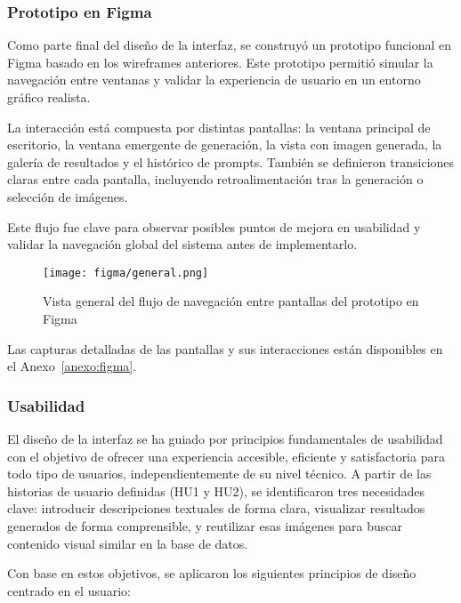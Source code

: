 \subsubsection{Prototipo en Figma}

Como parte final del diseño de la interfaz, se construyó un prototipo funcional en Figma basado en los wireframes anteriores. Este prototipo permitió simular la navegación entre ventanas y validar la experiencia de usuario en un entorno gráfico realista.

La interacción está compuesta por distintas pantallas: la ventana principal de escritorio, la ventana emergente de generación, la vista con imagen generada, la galería de resultados y el histórico de prompts. También se definieron transiciones claras entre cada pantalla, incluyendo retroalimentación tras la generación o selección de imágenes. 

Este flujo fue clave para observar posibles puntos de mejora en usabilidad y validar la navegación global del sistema antes de implementarlo.

\begin{figure}[H]
    \centering
    \texttt{[image: figma/general.png]}
    \caption{Vista general del flujo de navegación entre pantallas del prototipo en Figma}
    \label{fig:figma-prototype}
\end{figure}

Las capturas detalladas de las pantallas y sus interacciones están disponibles en el Anexo~\ref{anexo:figma}.

\subsubsection{Usabilidad}

El diseño de la interfaz se ha guiado por principios fundamentales de usabilidad con el objetivo de ofrecer una experiencia accesible, eficiente y satisfactoria para todo tipo de usuarios, independientemente de su nivel técnico. A partir de las historias de usuario definidas (HU1 y HU2), se identificaron tres necesidades clave: introducir descripciones textuales de forma clara, visualizar resultados generados de forma comprensible, y reutilizar esas imágenes para buscar contenido visual similar en la base de datos.

Con base en estos objetivos, se aplicaron los siguientes principios de diseño centrado en el usuario:

